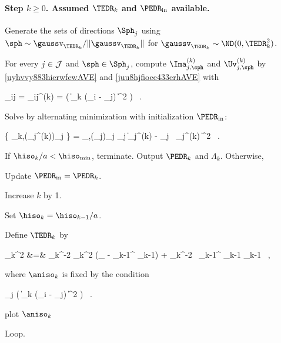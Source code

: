 \paragraph{Step \( k \geq 0 \). Assumed \( \TEDR_{k} \) and \( \PEDR_{\init} \) available.}

\begin{mylist}

\item
Generate the sets of directions \( \Sph_{j} \) using 
\( \sph \sim \gaussv_{\TEDR_{k}}/\| \gaussv_{\TEDR_{k}} \| \) for \( \gaussv_{\TEDR_{k}} \sim \ND(0,\TEDR_{k}^{2}) \).

\item 
For every \( j \in \mathcal{J} \) and \( \sph \in \Sph_{j} \), compute \( \Ima_{j,\sph}^{(k)} \) and \( \Uv_{j,\sph}^{(k)} \) by \eqref{uyhvvy883hierwfewAVE} and \eqref{juu8hjfioee433erhAVE} 
with 
\begin{EQA}[c]
	\weight_{ij} 
	= 
	\weight_{ij}^{(k)}
	= 
	\Kern\bigl( \| \TEDR_{k} (\Xv_{i} - \xv_{j}) \|^{2} \bigr) 
	\, .
\end{EQA}

\item 
Solve by alternating minimization with initialization \( \PEDR_{\init} \):
\begin{EQA}[c]
	\{ \PEDR_{k},(\fcl_{j}^{(k)})_{j \in \JJJ} \} 
	=
	\arginf_{\PEDR,(\fcl_{j})_{j \in \JJJ}} 
	\sum_{j \in \JJJ} \bigl\| \Imav_{j}^{(k)} - \fcl_{j} \, \UV_{j}^{(k)} \betav \bigr\|^{2}
	\, .
\end{EQA}

\item
If \( \hiso_{k} / a < \hiso_{\min} \), terminate. Output \( \PEDR_{k} \) and \( \Lambda_{k} \).
Otherwise,
\begin{mylist}
\item 
Update \( \PEDR_{\init} = \PEDR_{k} \).

\item
Increase \( k \) by 1.

\item 
Set \( \hiso_{k} = \hiso_{k-1} / a \).

\item 
Define \( \TEDR_{k} \) by 
\begin{EQA}[rcl]
	\TEDR_{k}^{2}
	&=&
	\hiso_{k}^{-2} \aniso_{k}^{2} (\Id_{\dimd} - \PEDR_{k-1}^{\T} \PEDR_{k-1}) 
	+ \hiso_{k}^{-2} \, \PEDR_{k-1}^{\T} \Lambda_{k-1} \PEDR_{k-1}
	\, ,
\end{EQA}
where \( \aniso_{k} \) is fixed by the condition
\begin{EQA}[c]
	 \sum_{j \in \JJJ} \sumi 
		\Kern\bigl( \| \TEDR_{k} (\Xv_{i} - \xv_{j}) \|^{2} \bigr)
	\geq 
	\nmin
	\, .
\end{EQA}
{\color{blue} plot \( \aniso_{k} \)}
\end{mylist}


\item Loop.

%
\end{mylist}


